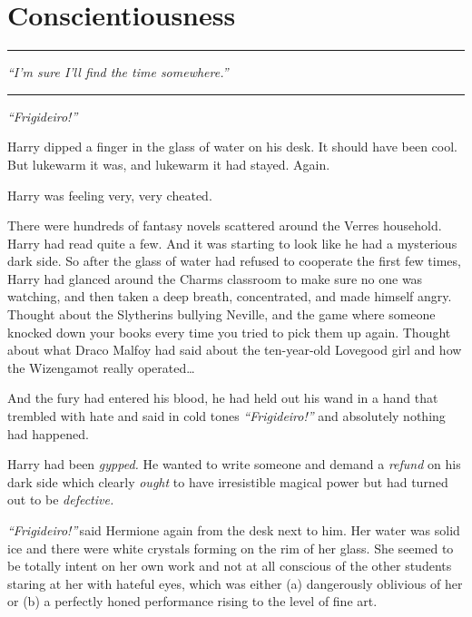 \chapter{Conscientiousness}\label{conscientiousness}

\begin{center}\rule{3in}{0.4pt}\end{center}

\emph{``I'm sure I'll find the time somewhere.''}

\begin{center}\rule{3in}{0.4pt}\end{center}

\emph{``Frigideiro!''}

Harry dipped a finger in the glass of water on his desk. It should have
been cool. But lukewarm it was, and lukewarm it had stayed. Again.

Harry was feeling very, very cheated.

There were hundreds of fantasy novels scattered around the Verres
household. Harry had read quite a few. And it was starting to look like
he had a mysterious dark side. So after the glass of water had refused
to cooperate the first few times, Harry had glanced around the Charms
classroom to make sure no one was watching, and then taken a deep
breath, concentrated, and made himself angry. Thought about the
Slytherins bullying Neville, and the game where someone knocked down
your books every time you tried to pick them up again. Thought about
what Draco Malfoy had said about the ten-year-old Lovegood girl and how
the Wizengamot really operated\ldots{}

And the fury had entered his blood, he had held out his wand in a hand
that trembled with hate and said in cold tones \emph{``Frigideiro!''}
and absolutely nothing had happened.

Harry had been \emph{gypped.} He wanted to write someone and demand a
\emph{refund} on his dark side which clearly \emph{ought} to have
irresistible magical power but had turned out to be \emph{defective.}

\emph{``Frigideiro!''} said Hermione again from the desk next to him.
Her water was solid ice and there were white crystals forming on the rim
of her glass. She seemed to be totally intent on her own work and not at
all conscious of the other students staring at her with hateful eyes,
which was either (a) dangerously oblivious of her or (b) a perfectly
honed performance rising to the level of fine art.

